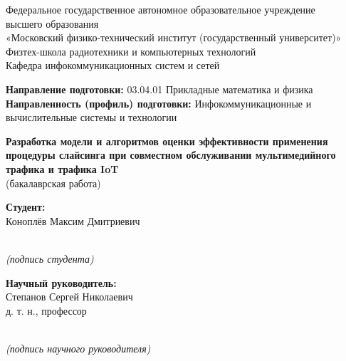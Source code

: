 \documentclass[12pt,a4paper,oneside]{article}
\begin{document}
		
		\begin{center}
		\begin{spacing}{1.0}
			Федеральное государственное автономное образовательное учреждение\\
			высшего образования\\ 
			«Московский физико-технический институт (государственный университет)»\\
			Физтех-школа радиотехники и компьютерных технологий\\
			Кафедра инфокоммуникационных систем и сетей
		\end{spacing}
		\end{center}
		
		\begin{flushleft}
		\begin{spacing}{1.0}
			\textbf{Направление подготовки:} 03.04.01 Прикладные математика и физика\\
			\textbf{Направленность (профиль) подготовки:} Инфокоммуникационные и вычислительные системы и технологии
		\end{spacing}
		\end{flushleft}
			
		\hfill \break
		\hfill \break

        \begin{center}
        \begin{spacing}{1.0}
            \large\textbf{Разработка  модели и алгоритмов оценки эффективности применения процедуры слайсинга при совместном обслуживании мультимедийного трафика  и трафика  IoT}\\
		\normalsize{(бакалаврская работа)}
	    	\end{spacing}
        \end{center}
        
        \hfill \break
		\hfill \break
		\hfill \break
        
      	\begin{spacing}{1.0}
        \begin{flushright}
            \begin{minipage}{200pt}
            \textbf{Студент:}\\
            \normalsize{Коноплёв Максим Дмитриевич}\\
            \underline{\hspace{200pt}}\\
            \centerline{\small\textit{(подпись студента)}}
            \hfill \break
            \textbf{Научный руководитель:}\\
            \normalsize{Степанов Сергей Николаевич}\\
            \normalsize{д. т. н., профессор}\\
            \underline{\hspace{200pt}}\\
            \centerline{\small\textit{(подпись научного руководителя)}}\\
        \end{minipage}
        \end{flushright}
        \end{spacing}
        
\end{document}

